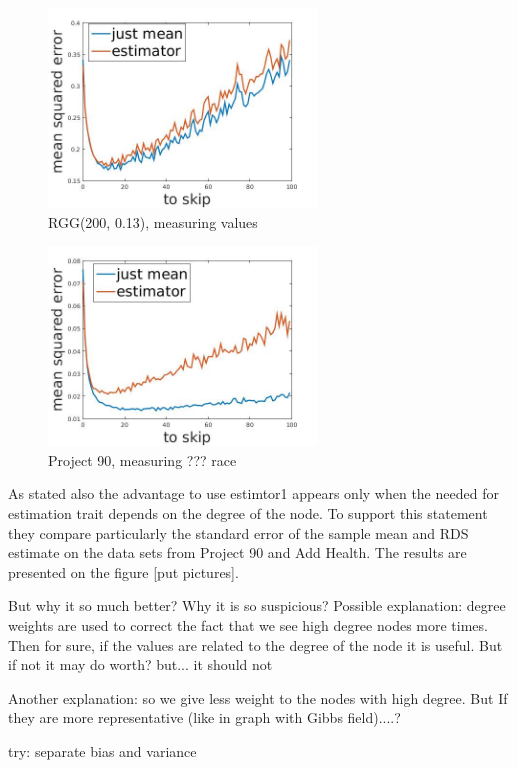 \documentclass[12pt]{report}
\begin{document}
\begin{figure}[h]
    \centering
    \includegraphics[height=200px]{RGGfield}
    \caption{ RGG(200, 0.13), measuring values }
\end{figure}


\begin{figure}[h]
    \centering
    \includegraphics[height=200px]{Pr90field}
    \caption{ Project 90, measuring ??? race}
\end{figure}


As stated also \cite{goel2010assessing} the advantage to use estimtor1 appears only when the needed for estimation trait depends on the degree of the node. To support this statement they compare particularly the standard error of the sample mean and RDS estimate on the data sets from Project 90 and Add Health. The results are presented on the figure [put pictures]. 

But why it so much better? Why it is so suspicious?
Possible explanation: degree weights are used to correct the fact that we see high degree nodes more times. Then for sure, if the values are related to the degree of the node it is useful.
But if not it may do worth? but... it should not 

Another explanation: so we give less weight to the nodes with high degree. But If they are more representative (like in graph with Gibbs field)....?


try: separate bias and variance
\end{document}
